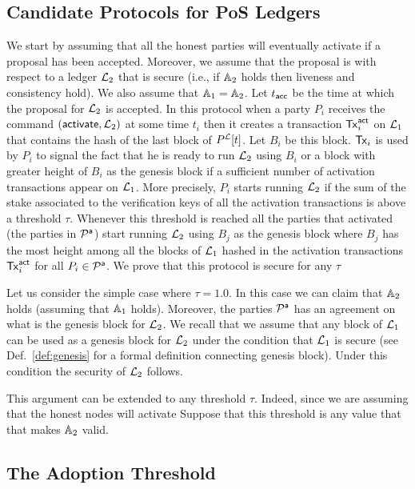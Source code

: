 \subsection{Candidate Protocols for PoS Ledgers}
We start by assuming that all the honest parties will eventually activate if a proposal has been accepted. Moreover, we assume that the proposal is with
respect to a ledger $\mathcal{L}_2$ that is secure (i.e., if $\mathbb{A}_2$ holds then liveness and consistency hold). We also assume that $\mathbb{A}_1=\mathbb{A}_2$. Let $t_{\mathsf{acc}}$ be the time at which the proposal 
for $\mathcal{L}_2$ is accepted.
In this protocol when a party $P_i$ receives the command $(\mathsf{activate}, \mathcal{L}_2)$ at some time $t_i$ then it creates a transaction $\mathsf{Tx}^\mathsf{act}_i$ on $\mathcal{L}_1$ that contains the hash of the last block of $P^{\mathcal{L}}[t]$. Let $B_i$ be this block. $\mathsf{Tx}_i$ is used by $P_i$ to signal the fact that he is ready to run $\mathcal{L}_2$ using $B_i$ or a block
with greater height of $B_i$ as the genesis block if a sufficient number of activation transactions appear on $\mathcal{L}_1$. 
More precisely, $P_i$ starts running $\mathcal{L}_2$ if the sum of the stake associated to the
verification keys of all the activation transactions is above a threshold $\tau$. Whenever this threshold is reached all the parties that activated (the parties in $\mathcal{P}^\mathsf{a}$)
start running $\mathcal{L}_2$ using $B_j$ as the genesis block where $B_j$ has the most height among all the blocks of $\mathcal{L}_1$ hashed in the activation transactions $\mathsf{Tx}^\mathsf{act}_i$
for all $P_i\in\mathcal{P}^\mathsf{a}$.
We prove that this protocol is secure for any $\tau$ 

Let us consider the simple case where $\tau=1.0$. In this case we can claim that $\mathbb{A}_2$ holds (assuming that $\mathbb{A}_1$ holds).
Moreover, the parties $\mathcal{P}^\mathsf{a}$ has an agreement on what is the genesis block for $\mathcal{L}_2$. We recall that we assume that any block of $\mathcal{L}_1$ can be used as
a genesis block for $\mathcal{L}_2$ under the condition that $\mathcal{L}_1$ is secure (see Def.~\ref{def:genesis} for a formal definition connecting genesis block).
Under this condition the security of $\mathcal{L}_2$  follows. 

 
This argument can be extended to any threshold $\tau$. Indeed, since we are assuming that the honest nodes will activate
Suppose that this threshold is any value that that makes $\mathbb{A}_2$ valid.

\subsection{The Adoption Threshold}

